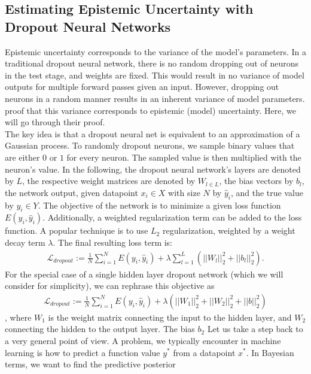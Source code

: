 \documentclass[a4paper,cleardoubleempty,BCOR1cm, 11pt]{report}
\begin{document}
\subsection{Estimating Epistemic Uncertainty with Dropout Neural Networks}\label{sec:dropoutuncertainty}
Epistemic uncertainty corresponds to the variance of the model's parameters.
In a traditional dropout neural network, there is no random dropping out of neurons in the test stage, and weights are fixed. This would result in no variance of model outputs for multiple forward passes given an input. However, dropping out neurons in a random manner results in an inherent variance of model parameters. \citet{gal2016dropout} proof that this variance corresponds to epistemic (model) uncertainty. Here, we will go through their proof.\\
The key idea is that a dropout neural net is equivalent to an approximation of a Gaussian process. To randomly dropout neurons, we sample binary values that are either $0$ or $1$ for every neuron. The sampled value is then multiplied with the neuron's value.
In the following, the dropout neural network's layers are denoted by $L$, the respective weight matrices are denoted by $W_{l \in L}$, the bias vectors by $b_l$, the network output, given datapoint $x_i \in X$ with size $N$ by $\hat{y}_i$, and the true value by $y_i \in Y$. The objective of the network is to minimize a given loss function $E(y_i, \hat{y}_i)$. Additionally, a weighted regularization term can be added to the loss function. A popular technique is to use $L_2$ regularization, weighted by a weight decay term $\lambda$. The final resulting loss term is:
\begin{align*}
\mathcal{L}_{dropout} := \frac{1}{N}\sum_{i=1}^{N}E(y_i, \hat{y}_i) + \lambda \sum_{l=1}^{L}(||W_l||^2_2 + ||b_l||^2_2).
\end{align*}
For the special case of a single hidden layer dropout network (which we will consider for simplicity), we can rephrase this objective as
\begin{align}\label{eq:dropout}
\mathcal{L}_{dropout} := \frac{1}{N}\sum_{i=1}^{N}E(y_i, \hat{y}_i) + \lambda (||W_1||^2_2 + ||W_2||^2_2+ ||b||^2_2)
\end{align}, where $W_1$ is the weight matrix connecting the input to the hidden layer, and $W_2$ connecting the hidden to the output layer. The bias $b_2$ 
Let us take a step back to a very general point of view. A problem, we typically encounter in machine learning is how to predict a function value $y^*$ from a datapoint $x^*$. In Bayesian terms, we want to find the predictive posterior
\end{document}
